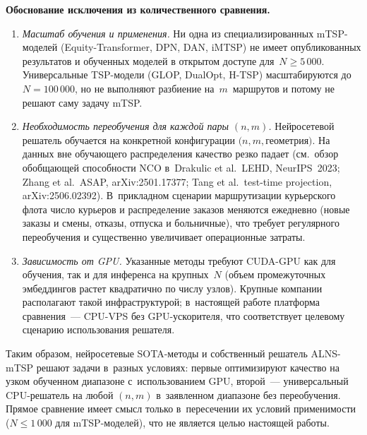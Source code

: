 \documentclass[a4paper,14pt]{extreport}
\begin{document}
\textbf{Обоснование исключения из количественного сравнения.}
\begin{enumerate}
\item \emph{Масштаб обучения и применения.} Ни одна из специализированных mTSP-моделей (Equity-Transformer, DPN, DAN, iMTSP) не имеет опубликованных результатов и обученных моделей в открытом доступе для~$N \geq 5\,000$. Универсальные TSP-модели (GLOP, DualOpt, H-TSP) масштабируются до~$N=100\,000$, но не выполняют разбиение на~$m$~маршрутов и потому не решают саму задачу mTSP.
\item \emph{Необходимость переобучения для каждой пары $(n, m)$.} Нейросетевой решатель обучается на конкретной конфигурации $(n, m, $геометрия$)$. На данных вне обучающего распределения качество резко падает (см.~обзор обобщающей способности NCO в~Drakulic et al.~LEHD, NeurIPS~2023; Zhang et al.~ASAP, arXiv:2501.17377; Tang et al.~test-time projection, arXiv:2506.02392). В~прикладном сценарии маршрутизации курьерского флота число курьеров и распределение заказов меняются ежедневно (новые заказы и смены, отказы, отпуска и больничные), что требует регулярного переобучения и существенно увеличивает операционные затраты.
\item \emph{Зависимость от GPU.} Указанные методы требуют CUDA-GPU как для обучения, так и для инференса на крупных~$N$ (объем промежуточных эмбеддингов растет квадратично по числу узлов). Крупные компании располагают такой инфраструктурой; в~настоящей работе платформа сравнения~--- CPU-VPS без GPU-ускорителя, что соответствует целевому сценарию использования решателя.
\end{enumerate}

Таким образом, нейросетевые SOTA-методы и собственный решатель ALNS-mTSP решают задачи в~разных условиях: первые оптимизируют качество на узком обученном диапазоне с~использованием GPU, второй~--- универсальный CPU-решатель на любой $(n, m)$ в~заявленном диапазоне без переобучения. Прямое сравнение имеет смысл только в~пересечении их условий применимости ($N \leq 1\,000$ для mTSP-моделей), что не является целью настоящей работы.
\end{document}
